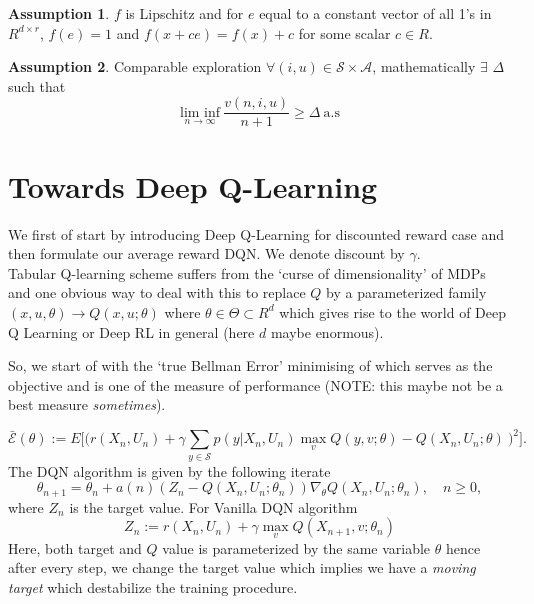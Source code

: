 \documentclass{article}
\theoremstyle{definition}
\newtheorem{assmp}{Assumption}[section]
\newcommand{\E}{\mathcal{E}}
\begin{document}
\begin{assmp}
\label{assmp:lip}
$f$ is Lipschitz and for $e$ equal to a constant vector of all 1's in $R^{d\times r}$, $f(e)=1$ and $f(x+ce)=f(x)+c$ for some scalar $c\in R$.
\end{assmp}
\begin{assmp}
\label{assmp:exp}
Comparable exploration $\forall (i,u)\in \mathcal{S}\times\mathcal{A}$, mathematically $\exists $ $\Delta$ such that
\[\underset{n\rightarrow\infty}{\text{lim inf}}\ \dfrac{v(n,i,u)}{n+1}\geq \Delta \ \text{a.s}\]
\end{assmp}
\section{Towards Deep Q-Learning}
We first of start by introducing Deep Q-Learning for discounted reward case and then formulate our average reward DQN. We denote discount by $\gamma$.
\\Tabular Q-learning scheme suffers from the `curse of dimensionality' of MDPs and one obvious way to deal with this to replace $Q$ by a parameterized family $(x,u,\theta) \rightarrow  Q(x,u;\theta)$ where $\theta \in \Theta \subset R^d$ which gives rise to the world of Deep Q Learning or Deep RL in general (here $d$ maybe enormous).

So, we start of with the `true Bellman Error' minimising of which serves as the objective and is one of the measure of performance (NOTE: this maybe not be a best measure \textit{sometimes}).


\begin{equation}
\bar{\E}(\theta) := E\Big[\Big(r(X_n, U_n) + \gamma\sum_{y\in\mathcal{S}} p(y|X_n,U_n)
\max_v Q(y,v; \theta) - Q(X_n,U_n;\theta)\ \Big)^2\Big]. \label{Ebar}
\end{equation}
The DQN algorithm is given by the following iterate
\begin{equation}
\theta_{n+1} = \theta_n +a(n)(Z_n - Q(X_n, U_n; \theta_n))\nabla_\theta Q(X_n, U_n; \theta_n), \quad n \geq 0, \label{dqniter}
\end{equation}
where $Z_n$ is the target value. 
For Vanilla DQN algorithm
\begin{equation}
Z_n := r(X_n,U_n)+\gamma \max_v Q(X_{n+1},v;\theta_n)\label{vanDQN}
\end{equation}
Here, both target and $Q$ value is parameterized by the same variable $\theta$ hence after every step, we change the target value which implies we have a \textit{moving target} which destabilize the training procedure.\\
\end{document}
